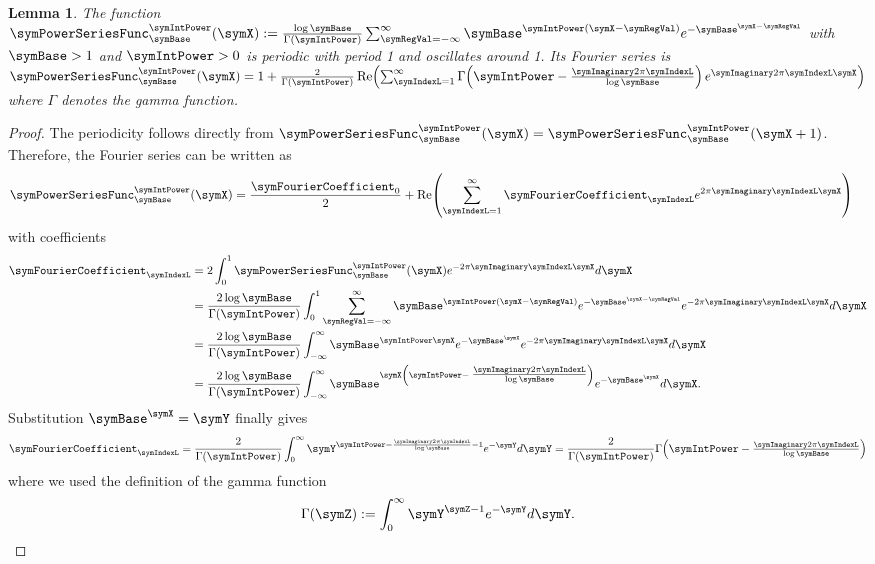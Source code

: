 \documentclass[sigconf, nonacm]{acmart}
\newtheorem{lemma}{Lemma}
\begin{document}
\begin{lemma}
\label{lem:xi}
The function 
$\symPowerSeriesFunc_\symBase^\symIntPower(\symX):= 
\frac{\log \symBase}{\Gamma(\symIntPower)} \sum_{\symRegVal = -\infty}^\infty
\symBase^{\symIntPower (\symX-\symRegVal)}
e^{-\symBase^{\symX-\symRegVal}}
$ with $\symBase>1$ and $\symIntPower>0$ is periodic with period 1 and oscillates around 1. Its Fourier series is 
$\symPowerSeriesFunc_\symBase^\symIntPower(\symX)= 
 1 + \frac{2}{\Gamma(\symIntPower)}\operatorname{Re}\!\left(\sum_{\symIndexL=1}^\infty \Gamma\!\left(\symIntPower - \textstyle\frac{\symImaginary 2\pi \symIndexL}{\log \symBase}\right)e^{ \symImaginary 2\pi\symIndexL \symX}\right)$ where $\Gamma$ denotes the gamma function.
\end{lemma}
\begin{proof}
The periodicity follows directly from  $\symPowerSeriesFunc_\symBase^\symIntPower(\symX) = \symPowerSeriesFunc_\symBase^\symIntPower(\symX + 1)$. 
Therefore, the Fourier series can be written as 
\begin{equation*}
\symPowerSeriesFunc_\symBase^\symIntPower(\symX)
=
\frac{\symFourierCoefficient_0}{2}
+
\operatorname{Re}\!\left(
\sum_{\symIndexL = 1}^\infty
\symFourierCoefficient_\symIndexL
e^{2\pi\symImaginary\symIndexL\symX}
\right)
\quad
\end{equation*}
with coefficients
\begin{align*}
\symFourierCoefficient_\symIndexL &= 
2\int_0^1
\symPowerSeriesFunc_\symBase^\symIntPower(\symX)
e^{-2\pi\symImaginary\symIndexL\symX}
d\symX
\\
&=
\frac{2\log \symBase}{\Gamma(\symIntPower)} 
\int_0^1
\sum_{\symRegVal = -\infty}^\infty
\symBase^{\symIntPower (\symX-\symRegVal)}
e^{-\symBase^{\symX-\symRegVal}}
e^{-2\pi\symImaginary\symIndexL\symX}
d\symX
\\
&=
\frac{2\log \symBase}{\Gamma(\symIntPower)} 
\int_{-\infty}^{\infty}
\symBase^{\symIntPower \symX}
e^{-\symBase^{\symX}}
e^{-2\pi\symImaginary\symIndexL\symX}
d\symX
\\
&=
\frac{2\log \symBase}{\Gamma(\symIntPower)} 
\int_{-\infty}^{\infty}
\symBase^{\symX\left(\symIntPower -\textstyle\frac{\symImaginary 2\pi \symIndexL}{\log \symBase}\right)}
e^{-\symBase^{\symX}}
d\symX.
\end{align*}
Substitution $\symBase^\symX=\symY$ finally gives
\begin{equation*}
\symFourierCoefficient_\symIndexL
= 
\frac{2}{\Gamma(\symIntPower)} 
\int_{0}^{\infty}
\symY^{\symIntPower-\frac{\symImaginary 2\pi\symIndexL}{\log\symBase}-1}
e^{-\symY}
d\symY
=
\frac{2}{\Gamma(\symIntPower)} 
\Gamma\!\left(\symIntPower - \textstyle\frac{\symImaginary 2\pi \symIndexL}{\log \symBase}\right)
\end{equation*}
where we used the definition of the gamma function 
\begin{equation*}
\Gamma(\symZ):=\int_0^\infty \symY^{\symZ-1}e^{-\symY}d\symY.
\end{equation*}
\end{proof}
\end{document}
